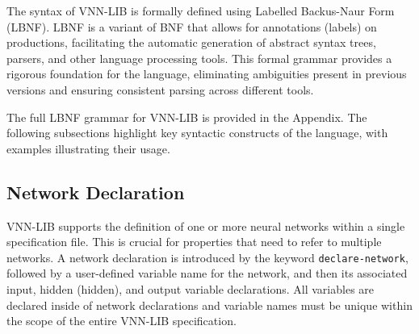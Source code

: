 


The syntax of VNN-LIB is formally defined using Labelled Backus-Naur Form (LBNF)\cite{8}. LBNF is a variant of BNF that allows for 
annotations (labels) on productions, facilitating the automatic generation of abstract syntax trees, parsers, and other language processing tools. 
This formal grammar provides a rigorous foundation for the language, eliminating ambiguities present in previous versions and ensuring consistent 
parsing across different tools.

The full LBNF grammar for VNN-LIB is provided in the Appendix. The following subsections highlight key syntactic constructs of the language,
with examples illustrating their usage.

\subsection{Network Declaration}
VNN-LIB supports the definition of one or more neural networks within a single specification file. This is crucial for properties that need to refer to
multiple networks. A network declaration is introduced by the keyword \texttt{declare-network}, followed by a user-defined variable name for the network, 
and then its associated input, hidden (hidden), and output variable declarations. All variables are declared inside of network declarations and variable 
names must be unique within the scope of the entire VNN-LIB specification.


